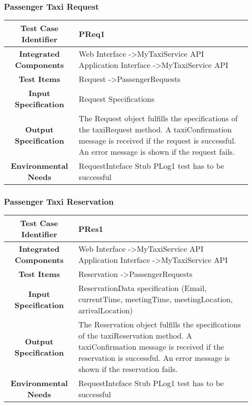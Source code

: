 \documentclass[11pt, a4paper,titlepage]{article}
\begin{document}
	\subsubsection{Passenger Taxi Request}
	\begin{tabularx}{\textwidth}{| c|X|}
		\hline \textbf{Test Case Identifier} & PReq1 \\
		\hline \textbf{Integrated Components} &  Web Interface -\textgreater MyTaxiService API \newline 
		Application Interface -\textgreater MyTaxiService API \\
		\hline \textbf{Test Items} & Request -\textgreater PassengerRequests \\
		\hline \textbf{Input Specification} & Request Specifications \\
		\hline \textbf{Output Specification} & 
		The Request object fulfills the specifications of the taxiRequest method.\newline	
		A taxiConfirmation message is received if the request is successful.\newline
		An error message is shown if the request fails. \\
		\hline \textbf{Environmental Needs} & RequestInteface Stub \newline PLog1 test has to be successful \\
		\hline
	\end{tabularx}
	\newline
	\newpage
	\subsubsection{Passenger Taxi Reservation}
	\begin{tabularx}{\textwidth}{| c|X|}
		\hline \textbf{Test Case Identifier} & PRes1 \\
		\hline \textbf{Integrated Components} & Web Interface -\textgreater MyTaxiService API \newline 
		Application Interface -\textgreater MyTaxiService API \\
		\hline \textbf{Test Items} & Reservation -\textgreater PassengerRequests \\
		\hline \textbf{Input Specification} & ReservationData specification (Email, currentTime, meetingTime, meetingLocation, arrivalLocation) \\
		\hline \textbf{Output Specification} & 
		The Reservation object fulfills the specifications of the taxiReservation method.\newline
		A taxiConfirmation message is received if the reservation is successful.\newline
		An error message is shown if the reservation fails. \\
		\hline \textbf{Environmental Needs} & RequestInteface Stub \newline PLog1 test has to be successful \\
		\hline
	\end{tabularx}
	\newline
	\newline
\end{document}
